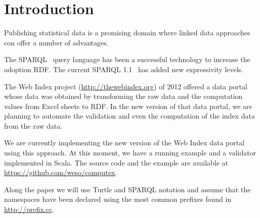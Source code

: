 \section{Introduction}

Publishing statistical data is a promising domain where linked data approaches
con offer a number of advantages. 


The SPARQL~\cite{SPARQL10} query language has been a successful technology to
increase the adoption RDF. 
The current SPARQL 1.1~\cite{SPARQL11} has added
new expressivity levels. 



The Web Index project (\url{http://thewebindex.org}) of 2012
offered a data portal whose data
was obtained by transforming the raw data and the computation values from Excel 
sheets to RDF\cite{Alvarez13}. 
In the new version of that data portal, we are planning to automate the
validation and even the computation of the index data from the raw data. 



We are currently implementing the new version of the Web Index data portal using
this approach. At this moment, we have a running example and a validator
implemented in Scala. 
The source code and the example are available at
\url{https://github.com/weso/computex}.

Along the paper we will use Turtle and SPARQL notation and assume that the
namespaces have been declared using the most common prefixes found in
\url{http://prefix.cc}.
